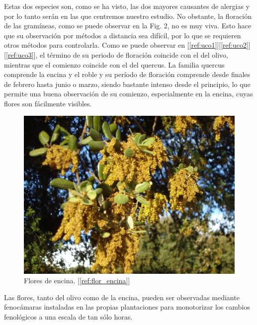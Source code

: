 \documentclass[12pt,oneside,a4paper]{article}
\numberwithin{figure}{section}
\begin{document}
Estas dos especies son, como se ha visto, las dos mayores causantes de alergias y por lo tanto serán en las que centremos nuestro estudio. No obstante, la floración de las gramíneas, como se puede observar en la Fig. 2, no es muy viva. Esto hace que su observación por métodos a distancia sea difícil, por lo que se requieren otros métodos para controlarla. Como se puede observar en [\ref{ref:uco1}][\ref{ref:uco2}][\ref{ref:uco3}], el término de su periodo de floración coincide con el del olivo, mientras que el comienzo coincide con el del quercus. La familia quercus comprende la encina y el roble y su período de floración comprende desde finales de febrero hasta junio o marzo, siendo bastante intenso desde el principio, lo que permite una buena observación de su comienzo, especialmente en la encina, cuyas flores son fácilmente visibles.

\begin{figure}[H]
\begin{center}
\includegraphics[scale=.3]{flor_encina.jpg}
\caption{Flores de encina. [\ref{ref:flor_encina}]}
\label{fig:flor_encina}
\end{center}
\end{figure}

Las flores, tanto del olivo como de la encina, pueden ser observadas mediante fenocámaras instaladas en las propias plantaciones para monotorizar los cambios fenológicos a una escala de tan sólo horas.
\end{document}
